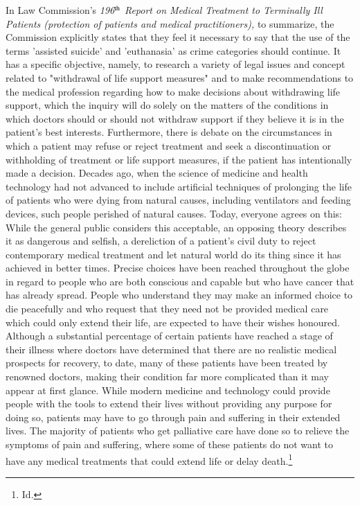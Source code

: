 \begin{multicols}{2}
\noi
In Law Commission’s \textit{196$^{\rm th}$ Report on Medical Treatment to Terminally Ill Patients
(protection of patients and medical practitioners),} to summarize, the Commission explicitly
states that they feel it necessary to say that the use of the terms 'assisted suicide' and
'euthanasia' as crime categories should continue. It has a specific objective, namely, to
research a variety of legal issues and concept related to "withdrawal of life support measures"  
and to make recommendations to the medical profession regarding how to make decisions
about withdrawing life support, which the inquiry will do solely on the matters of the
conditions in which doctors should or should not withdraw support if they believe it is in the
patient's best interests. Furthermore, there is debate on the circumstances in which a patient
may refuse or reject treatment and seek a discontinuation or withholding of treatment or life
support measures, if the patient has intentionally made a decision. Decades ago, when the
science of medicine and health technology had not advanced to include artificial techniques
of prolonging the life of patients who were dying from natural causes, including ventilators
and feeding devices, such people perished of natural causes. Today, everyone agrees on this:
While the general public considers this acceptable, an opposing theory describes it as
dangerous and selfish, a dereliction of a patient's civil duty to reject contemporary medical
treatment and let natural world do its thing since it has achieved in better times. Precise
choices have been reached throughout the globe in regard to people who are both conscious
and capable but who have cancer that has already spread. People who understand they may
make an informed choice to die peacefully and who request that they need not be provided
medical care which could only extend their life, are expected to have their wishes honoured.
Although a substantial percentage of certain patients have reached a stage of their illness
where doctors have determined that there are no realistic medical prospects for recovery, to
date, many of these patients have been treated by renowned doctors, making their condition
far more complicated than it may appear at first glance. While modern medicine and
technology could provide people with the tools to extend their lives without providing any
purpose for doing so, patients may have to go through pain and suffering in their extended
lives. The majority of patients who get palliative care have done so to relieve the symptoms
of pain and suffering, where some of these patients do not want to have any medical
treatments that could extend life or delay death.\footnote{ Id.}


\end{multicols}
